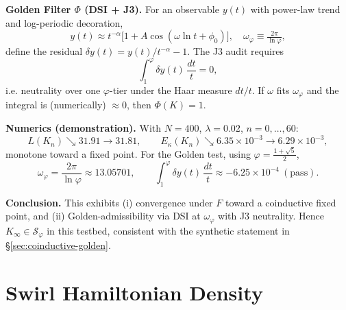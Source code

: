 \documentclass[10pt,reprint,aps,onecolumn,nofootinbib]{revtex4-2}
\begin{document}
        \medskip
        \noindent
        \textbf{Golden Filter \(\Phi\) (DSI + J3).} For an observable \(y(t)\) with power-law trend
        and log-periodic decoration,
        \[
            y(t)\approx t^{-\alpha}\bigl[1+A\cos(\omega\ln t+\phi_0)\bigr],
            \quad
            \omega_\varphi \equiv \tfrac{2\pi}{\ln\varphi},
        \]
        define the residual \(\delta y(t) = y(t)/t^{-\alpha}-1\).
        The J3 audit requires
        \[
            \int_{1}^{\varphi}\delta y(t)\,\frac{dt}{t}=0,
        \]
        i.e. neutrality over one \(\varphi\)-tier under the Haar measure \(dt/t\).
        If \(\omega\) fits \(\omega_\varphi\) and the integral is (numerically) \(\approx 0\), then \(\Phi(K)=1\).

        \medskip
        \noindent
        \textbf{Numerics (demonstration).}
        With \(N=400\), \(\lambda=0.02\), \(n=0,\dots,60\):
        \[
            L(K_n)\searrow 31.91\rightarrow 31.81,\qquad
            E_\kappa(K_n)\searrow 6.35\!\times\!10^{-3}\rightarrow 6.29\!\times\!10^{-3},
        \]
        monotone toward a fixed point.
        For the Golden test, using \(\varphi=\tfrac{1+\sqrt{5}}{2}\),
        \[
            \omega_\varphi=\frac{2\pi}{\ln\varphi}\approx 13.05701,
            \qquad
            \int_{1}^{\varphi}\delta y(t)\,\frac{dt}{t}\approx -6.25\times10^{-4}\ (\text{pass}).
        \]

        \medskip
        \noindent
        \textbf{Conclusion.}
        This exhibits (i) convergence under \(F\) toward a coinductive fixed point, and
        (ii) Golden-admissibility via DSI at \(\omega_\varphi\) with J3 neutrality.
        Hence \(K_\infty\in\mathcal S_\varphi\) in this testbed, consistent with the
        synthetic statement in \S\ref{sec:coinductive-golden}.



    \section{Swirl Hamiltonian Density}
    \label{canon58:appA}
\end{document}
